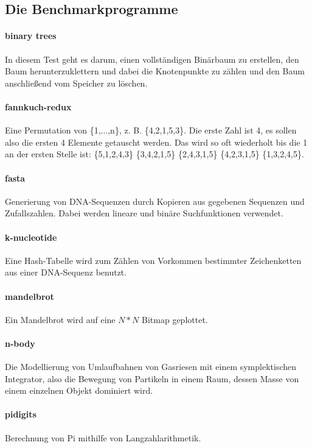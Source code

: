 \subsection{Die Benchmarkprogramme}

\paragraph{binary trees}

In diesem Test geht es darum, einen vollständigen Binärbaum zu erstellen, den Baum \glqq herunterzuklettern\grqq{} und dabei die Knotenpunkte zu zählen und den Baum anschließend vom Speicher zu löschen.

\paragraph{fannkuch-redux} Eine Permutation von \{1,...,n\}, z. B. \{4,2,1,5,3\}. Die erste Zahl ist 4, es sollen also die ersten 4 Elemente getauscht werden. Das wird so oft wiederholt bis die 1 an der ersten Stelle ist: \{5,1,2,4,3\} \{3,4,2,1,5\} \{2,4,3,1,5\} \{4,2,3,1,5\} \{1,3,2,4,5\}.

\paragraph{fasta} Generierung von DNA-Sequenzen durch Kopieren aus gegebenen Sequenzen und Zufallszahlen. Dabei werden lineare und binäre Suchfunktionen verwendet.

\paragraph{k-nucleotide} Eine Hash-Tabelle wird zum Zählen von Vorkommen bestimmter Zeichenketten aus einer DNA-Sequenz benutzt.

\paragraph{mandelbrot} Ein Mandelbrot wird auf eine $N*N$ Bitmap geplottet.

\paragraph{n-body} Die Modellierung von Umlaufbahnen von Gasriesen mit einem symplektischen Integrator, also die Bewegung von Partikeln in einem Raum, dessen Masse von einem einzelnen Objekt dominiert wird.

\paragraph{pidigits} Berechnung von Pi mithilfe von Langzahlarithmetik.

